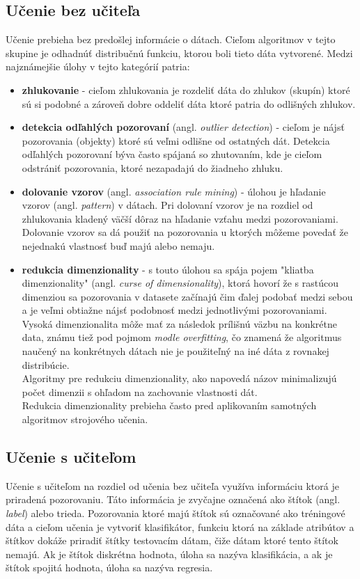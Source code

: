 \documentclass[slovak,master,dept460,male,cpp,cpdeclaration]{diploma}
\begin{document}
\subsection{Učenie bez učiteľa}
Učenie prebieha bez predošlej informácie o dátach. Cieľom algoritmov v tejto skupine je odhadnúť distribučnú funkciu, ktorou boli tieto dáta vytvorené.
Medzi najznámejšie úlohy v tejto kategórií patria:
\begin{itemize}
\item \textbf{zhlukovanie} - cieľom zhlukovania je rozdeliť dáta do zhlukov (skupín) ktoré sú si podobné a zároveň dobre oddeliť dáta ktoré patria do odlišných zhlukov.
\item \textbf{detekcia odľahlých pozorovaní} (angl. \textit{outlier detection}) - cieľom je nájsť pozorovania (objekty) ktoré sú veľmi odlišne od ostatných dát. Detekcia odľahlých pozorovaní býva často spájaná so zhutovaním, kde je cieľom odstrániť pozorovania, ktoré nezapadajú do žiadneho zhluku.
\item \textbf{dolovanie vzorov} (angl. \textit{association rule mining}) - úlohou je hľadanie vzorov (angl. \textit{pattern}) v dátach. Pri dolovaní vzorov je na rozdiel od zhlukovania kladený väčší dôraz na hľadanie vzťahu medzi pozorovaniami. Dolovanie vzorov sa dá použiť na pozorovania u ktorých môžeme povedať že nejednakú vlastnosť buď majú  alebo nemaju.
\item \textbf{redukcia dimenzionality} - s touto úlohou sa spája pojem "kliatba dimenzionality" (angl. \textit{curse of dimensionality}), ktorá hovorí že s rastúcou dimenziou sa pozorovania v datasete začínajú čim ďalej podobať medzi sebou a je veľmi obtiažne nájsť podobnosť medzi jednotlivými pozorovaniami. Vysoká dimenzionalita môže mať za následok prílišnú väzbu na konkrétne data, známu tiež pod pojmom  \textit{modle overfitting}, čo znamená že algoritmus naučený na konkrétnych dátach nie je použiteľný na iné dáta z rovnakej distribúcie. \\ Algoritmy pre redukciu dimenzionality, ako napovedá názov minimalizujú počet dimenzii s ohľadom na zachovanie vlastnosti dát. \\ Redukcia dimenzionality prebieha často pred aplikovaním samotných algoritmov strojového učenia.
\end{itemize}
\subsection{Učenie s učiteľom}
Učenie s učiteľom na rozdiel od učenia bez učiteľa využíva informáciu ktorá je priradená pozorovaniu. Táto informácia je zvyčajne označená ako štítok (angl. \textit{label}) alebo trieda.  Pozorovania ktoré majú štítok sú označované ako tréningové dáta a cieľom učenia je vytvoriť klasifikátor, funkciu ktorá na základe atribútov a štítkov dokáže priradiť štítky testovacím dátam, čiže dátam ktoré tento štítok nemajú.
Ak je štítok diskrétna hodnota, úloha sa nazýva klasifikácia, a ak je štítok spojitá hodnota, úloha sa nazýva regresia.
\end{document}

